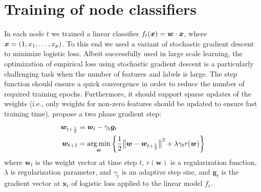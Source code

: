 \documentclass{article}
\DeclarePairedDelimiter{\norm}{\lVert}{\rVert}
\begin{document}
%

\section{Training of node classifiers}
\label{sec:training_of_node_classifiers}

In each node $t$ we trained a linear classifier $f_t(\boldsymbol{x}) = \boldsymbol{w} \cdot \boldsymbol{x}$, where $\boldsymbol{x} = (1, x_1, \ldots, x_p)$.  To this end we used a variant of stochastic gradient descent to minimize logistic loss. Albeit successfully used in large scale learning, the optimization of empirical loss using stochastic gradient descent is a particularly challenging task when the number of features and labels is large. The step function should ensure a quick convergence in order to reduce the number of required training epochs. Furthermore, it should support sparse updates of the weights (i.e., only weights for non-zero features should be updated to ensure fast training time). %
\citet{Duchi_Singer_2009} propose a two phase gradient step:
\begin{align*}
	\label{eq:fobos}
	\bm{w}_{t+\frac12} &= \bm{w}_t - \gamma_t \bm{g}_t\\
	\bm{w}_{t+1} &= \argmin_{\bm{w}}\left\{ \frac12 \norm[\big]{ \bm{w} - \bm{w}_{t+\frac12}}^2
	+ \lambda \gamma_{t} r(\bm{w})\right\}
\end{align*}
where $\bm{w}_t$ is the weight vector at time step $t$, $r(\bm{w})$ is a
regularization function, $\lambda$ is regularization parameter, and $\gamma_t$ is an adaptive step size, and $\bm{g}_t$ is the gradient vector at $\bm{x}_t$ of logistic loss applied to the linear model $f_t$. 
\end{document}
